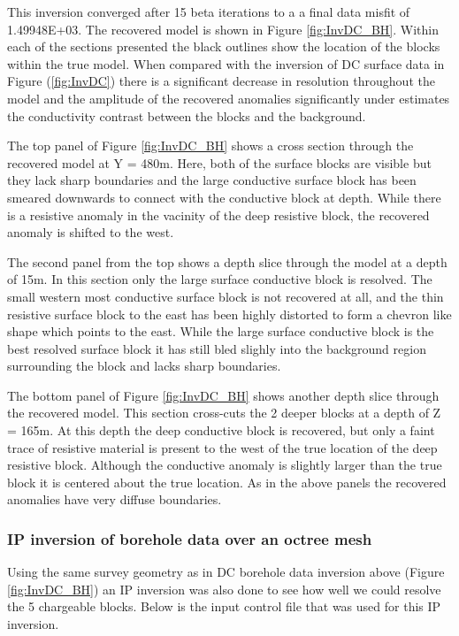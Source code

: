 This inversion converged after 15 beta iterations to a a final data misfit of 1.49948E+03. The recovered model is shown in Figure \ref{fig:InvDC_BH}. Within each of the sections presented the black outlines show the location of the blocks within the true model. When compared with the inversion of DC surface data in Figure (\ref{fig:InvDC}) there is a significant decrease in resolution throughout the model and the amplitude of the recovered anomalies significantly under estimates the conductivity contrast between the blocks and the background. 

The top panel of Figure \ref{fig:InvDC_BH} shows a cross section through the recovered model at Y = 480m. Here, both of the surface blocks are visible but they lack sharp boundaries and the large conductive surface block has been smeared downwards to connect with the conductive block at depth. While there is a resistive anomaly in the vacinity of the deep resistive block, the recovered anomaly is shifted to the west.

The second panel from the top shows a depth slice through the model at a depth of 15m. In this section only the large surface conductive block is resolved. The small western most conductive surface block is not recovered at all, and the thin resistive surface block to the east has been highly distorted to form a chevron like shape which points to the east. While the large surface conductive block is the best resolved surface block it has still bled slighly into the background region surrounding the block and lacks sharp boundaries. 

The bottom panel of Figure \ref{fig:InvDC_BH} shows another depth slice through the recovered model. This section cross-cuts the 2 deeper blocks at a depth of Z = 165m. At this depth the deep conductive block is recovered, but only a faint trace of resistive material is present to the west of the true location of the deep resistive block. Although the conductive anomaly is slightly larger than the true block it is centered about the true location. As in the above panels the recovered anomalies have very diffuse boundaries.


\subsubsection{IP inversion of borehole data over an octree mesh}

Using the same survey geometry as in DC borehole data inversion above (Figure \ref{fig:InvDC_BH}) an IP inversion was also done to see how well we could resolve the 5 chargeable blocks. Below is the input control file that was used for this IP inversion.

